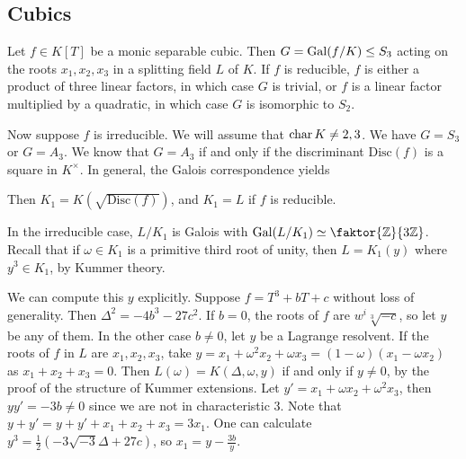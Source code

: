 \subsection{Cubics}
Let \( f \in K[T] \) be a monic separable cubic.
Then \( G = \operatorname{Gal}(f/K) \leq S_3 \) acting on the roots \( x_1, x_2, x_3 \) in a splitting field \( L \) of \( K \).
If \( f \) is reducible, \( f \) is either a product of three linear factors, in which case \( G \) is trivial, or \( f \) is a linear factor multiplied by a quadratic, in which case \( G \) is isomorphic to \( S_2 \).

Now suppose \( f \) is irreducible.
We will assume that \( \operatorname{char} K \neq 2, 3 \).
We have \( G = S_3 \) or \( G = A_3 \).
We know that \( G = A_3 \) if and only if the discriminant \( \mathrm{Disc}(f) \) is a square in \( K^\times \).
In general, the Galois correspondence yields
\begin{center}
\end{center}
Then \( K_1 = K(\sqrt{\mathrm{Disc}(f)}) \), and \( K_1 = L \) if \( f \) is reducible.

In the irreducible case, \( L / K_1 \) is Galois with \( \Gal(L/K_1) \simeq \faktor{\mathbb Z}{3\mathbb Z} \).
Recall that if \( \omega \in K_1 \) is a primitive third root of unity, then \( L = K_1(y) \) where \( y^3 \in K_1 \), by Kummer theory.

We can compute this \( y \) explicitly.
Suppose \( f = T^3 + bT + c \) without loss of generality.
Then \( \Delta^2 = -4b^3 - 27c^2 \).
If \( b = 0 \), the roots of \( f \) are \( w^i \sqrt[3]{-c} \), so let \( y \) be any of them.
In the other case \( b \neq 0 \), let \( y \) be a Lagrange resolvent.
If the roots of \( f \) in \( L \) are \( x_1, x_2, x_3 \), take \( y = x_1 + \omega^2 x_2 + \omega x_3 = (1-\omega)(x_1 - \omega x_2) \) as \( x_1 + x_2 + x_3 = 0 \).
Then \( L(\omega) = K(\Delta, \omega, y) \) if and only if \( y \neq 0 \), by the proof of the structure of Kummer extensions.
Let \( y' = x_1 + \omega x_2 + \omega^2 x_3 \), then \( yy' = -3b \neq 0 \) since we are not in characteristic 3.
Note that \( y + y' = y + y' + x_1 + x_2 + x_3 = 3x_1 \).
One can calculate \( y^3 = \frac{1}{2} (-3\sqrt{-3} \Delta + 27c) \), so \( x_1 = y - \frac{3b}{y} \).

